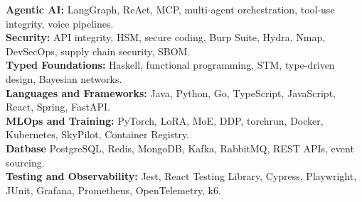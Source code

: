\documentclass[a4paper,10pt]{article}
\begin{document}
\begin{itemize}[leftmargin=0.15in, label={}]
\small{
\item{
  \textbf{Agentic AI:} LangGraph, ReAct, MCP, multi-agent orchestration, tool-use integrity, voice pipelines. \\[3pt]

  \textbf{Security:} API integrity, HSM, secure coding, Burp Suite, Hydra, Nmap, DevSecOps, supply chain security, SBOM. \\[3pt]

  \textbf{Typed Foundations:} Haskell, functional programming, STM, type-driven design, Bayesian networks. \\[3pt]

  \textbf{Languages and Frameworks:} Java, Python, Go, TypeScript, JavaScript, React, Spring, FastAPI. \\[3pt]

  \textbf{MLOps and Training:} PyTorch, LoRA, MoE, DDP, torchrun, Docker, Kubernetes, SkyPilot, Container Registry. \\[3pt]

  \textbf{Datbase} PostgreSQL, Redis, MongoDB, Kafka, RabbitMQ, REST APIs, event sourcing. \\[3pt]

  \textbf{Testing and Observability:} Jest, React Testing Library, Cypress, Playwright, JUnit, Grafana, Prometheus, OpenTelemetry, k6.
}}
\end{itemize}
\end{document}
